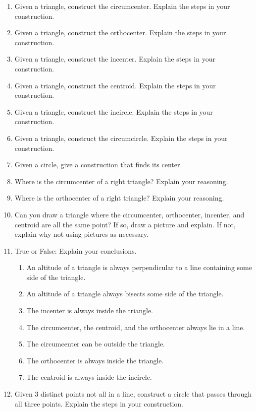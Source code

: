 \begin{problems}
\begin{enumerate}
\item Given a triangle, construct the circumcenter. Explain the steps
  in your construction.
\item Given a triangle, construct the orthocenter. Explain the steps
  in your construction.
\item Given a triangle, construct the incenter. Explain the steps in
  your construction.
\item Given a triangle, construct the centroid. Explain the steps in
  your construction.
\item Given a triangle, construct the incircle. Explain the steps in
  your construction.
\item Given a triangle, construct the circumcircle. Explain the steps
  in your construction.
\item Given a circle, give a construction that finds its center. 
\item Where is the circumcenter of a right triangle? Explain your
  reasoning.
\item Where is the orthocenter of a right triangle? Explain your
  reasoning.
\item Can you draw a triangle where the circumcenter, orthocenter,
  incenter, and centroid are all the same point?  If so, draw a
  picture and explain. If not, explain why not using pictures as
  necessary.
\item True or False: Explain your conclusions.
\begin{enumerate}
\item An altitude of a triangle is always perpendicular to a line
  containing some side of the triangle.
\item An altitude of a triangle always bisects some side of the
  triangle.
\item The incenter is always inside the triangle.
\item The circumcenter, the centroid, and the orthocenter always lie in a line.
\item The circumcenter can be outside the triangle.
\item The orthocenter is always inside the triangle.
\item The centroid is always inside the incircle.
\end{enumerate}
\item Given 3 distinct points not all in a line, construct a circle
  that passes through all three points. Explain the steps in your
  construction.
\end{enumerate}
\end{problems}

